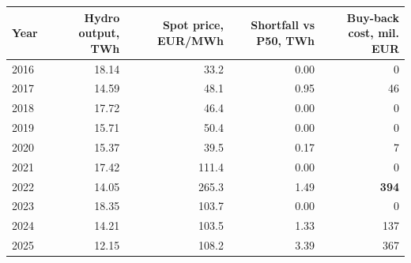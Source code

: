 \begin{tabular}{lrrrr}
\toprule
Year & Hydro output, TWh & Spot price, EUR/MWh & Shortfall vs P50, TWh & Buy-back cost, mil. EUR \\
\midrule
2016 & 18.14 & 33.2 & 0.00 & 0 \\
2017 & 14.59 & 48.1 & 0.95 & 46 \\
2018 & 17.72 & 46.4 & 0.00 & 0 \\
2019 & 15.71 & 50.4 & 0.00 & 0 \\
2020 & 15.37 & 39.5 & 0.17 & 7 \\
2021 & 17.42 & 111.4 & 0.00 & 0 \\
2022 & 14.05 & 265.3 & 1.49 & \textbf{394} \\
2023 & 18.35 & 103.7 & 0.00 & 0 \\
2024 & 14.21 & 103.5 & 1.33 & 137 \\
2025 & 12.15 & 108.2 & 3.39 & 367 \\
\bottomrule
\end{tabular}
